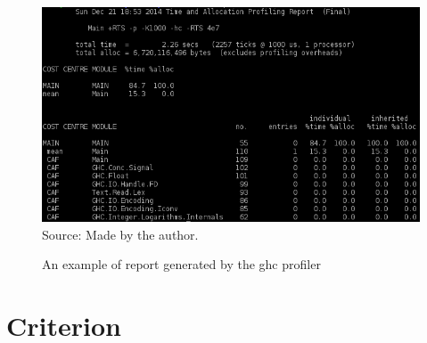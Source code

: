 \begin{figure}[htp]
  \centering
  \caption{An example of report generated by the \ac{ghc} profiler}
  \includegraphics[width=\columnwidth]{images/profiler-placeholder}
  \footnotesize{Source: Made by the author.}
  \label{fig:profiler-sample}
\end{figure}


\section{Criterion}\label{sec:criterion}
\lipsum[1-4]
